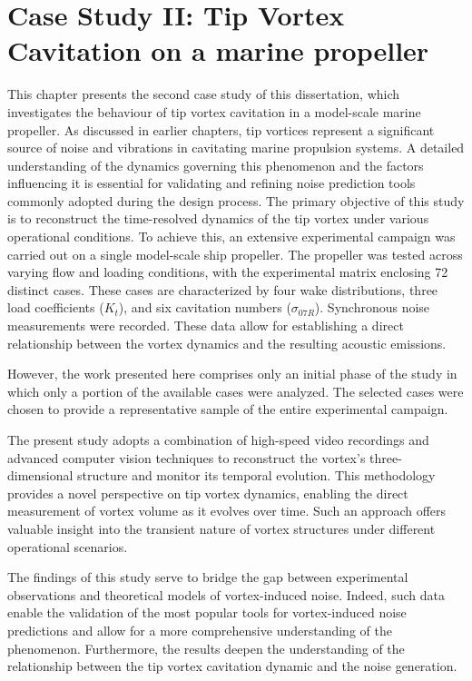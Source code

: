 \chapter{Case Study II: Tip Vortex Cavitation on a marine propeller}
\label{chap:chapter6}

This chapter presents the second case study of this dissertation, which investigates the behaviour of tip vortex cavitation in a model-scale marine propeller. As discussed in earlier chapters, tip vortices represent a significant source of noise and vibrations in cavitating marine propulsion systems. A detailed understanding of the dynamics governing this phenomenon and the factors influencing it is essential for validating and refining noise prediction tools commonly adopted during the design process.
The primary objective of this study is to reconstruct the time-resolved dynamics of the tip vortex under various operational conditions. To achieve this, an extensive experimental campaign was carried out on a single model-scale ship propeller. 
The propeller was tested across varying flow and loading conditions, with the experimental matrix enclosing 72 distinct cases. These cases are characterized by four wake distributions, three load coefficients ($K_t$), and six cavitation numbers ($\sigma_{07R}$). Synchronous noise measurements were recorded. These data allow for establishing a direct relationship between the vortex dynamics and the resulting acoustic emissions. 

However, the work presented here comprises only an initial phase of the study in which only a portion of the available cases were analyzed. 
The selected cases were chosen to provide a representative sample of the entire experimental campaign. 

The present study adopts a combination of high-speed video recordings and advanced computer vision techniques to reconstruct the vortex's three-dimensional structure and monitor its temporal evolution.
This methodology provides a novel perspective on tip vortex dynamics, enabling the direct measurement of vortex volume as it evolves over time. Such an approach offers valuable insight into the transient nature of vortex structures under different operational scenarios.

The findings of this study serve to bridge the gap between experimental observations and theoretical models of vortex-induced noise. Indeed, such data enable the validation of the most popular tools for vortex-induced noise predictions and allow for a more comprehensive understanding of the phenomenon.
Furthermore, the results deepen the understanding of the relationship between the tip vortex cavitation dynamic and the noise generation. 

